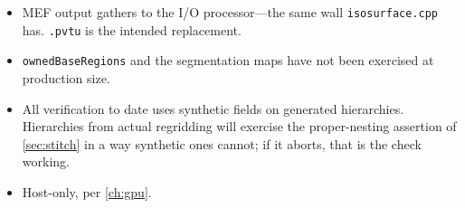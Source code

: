 \begin{itemize}[leftmargin=*]
\item MEF output gathers to the I/O processor---the same wall
  \texttt{isosurface.cpp} has. \texttt{.pvtu} is the intended replacement.
\item \texttt{ownedBaseRegions} and the segmentation maps have not been exercised
  at production size.
\item All verification to date uses synthetic fields on generated hierarchies.
  Hierarchies from actual regridding will exercise the proper-nesting assertion
  of \cref{sec:stitch} in a way synthetic ones cannot; if it aborts, that is the
  check working.
\item Host-only, per \cref{ch:gpu}.
\end{itemize}
